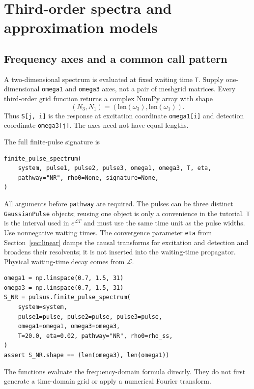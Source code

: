\section{Third-order spectra and approximation models}
\label{sec:third-order}

\subsection{Frequency axes and a common call pattern}

A two-dimensional spectrum is evaluated at fixed waiting time
\texttt{T}. Supply one-dimensional \texttt{omega1} and \texttt{omega3}
axes, not a pair of meshgrid matrices. Every third-order grid function
returns a complex NumPy array with shape
\begin{equation}
 (N_3,N_1)=(\mathrm{len}(\omega_3),\mathrm{len}(\omega_1)).
\end{equation}
Thus \texttt{S[j, i]} is the response at excitation coordinate
\texttt{omega1[i]} and detection coordinate \texttt{omega3[j]}.
The axes need not have equal lengths.

The full finite-pulse signature is
\par\noindent
\begin{minipage}{\linewidth}
\begin{lstlisting}[style=python]
finite_pulse_spectrum(
    system, pulse1, pulse2, pulse3, omega1, omega3, T, eta,
    pathway="NR", rho0=None, signature=None,
)
\end{lstlisting}
\end{minipage}\par
All arguments before \texttt{pathway} are required. The pulses can be
three distinct \texttt{GaussianPulse} objects; reusing one object is only
a convenience in the tutorial. \texttt{T} is the interval used in
$e^{\mathcal L T}$ and must use the same time unit as the pulse widths.
Use nonnegative waiting times. The convergence parameter \texttt{eta}
from Section~\ref{sec:linear} damps the causal transforms for excitation
and detection and broadens their resolvents; it is not inserted into the
waiting-time propagator.
Physical waiting-time decay comes from $\mathcal L$.

\par\noindent
\begin{minipage}{\linewidth}
\begin{lstlisting}[style=python]
omega1 = np.linspace(0.7, 1.5, 31)
omega3 = np.linspace(0.7, 1.5, 31)
S_NR = pulsus.finite_pulse_spectrum(
    system=system,
    pulse1=pulse, pulse2=pulse, pulse3=pulse,
    omega1=omega1, omega3=omega3,
    T=20.0, eta=0.02, pathway="NR", rho0=rho_ss,
)
assert S_NR.shape == (len(omega3), len(omega1))
\end{lstlisting}
\end{minipage}\par
The functions evaluate the frequency-domain formula directly. They do not
first generate a time-domain grid or apply a numerical Fourier transform.

